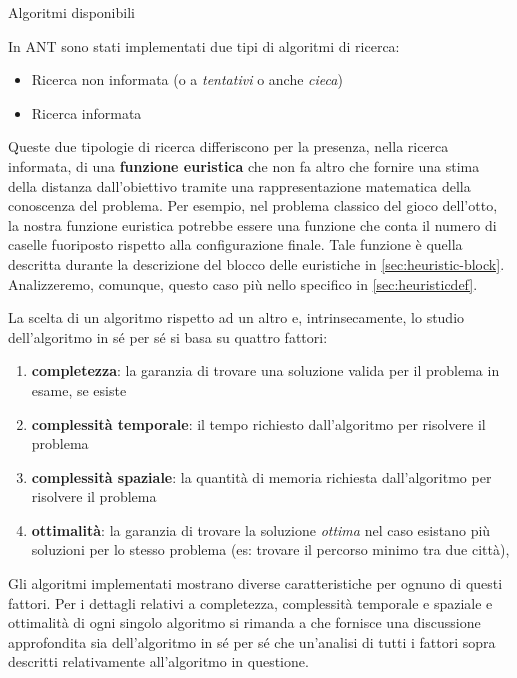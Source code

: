 \begin{chapter}{Algoritmi disponibili}
\label{sec:algoritmi}

In ANT sono stati implementati due tipi di algoritmi di ricerca:
\begin{itemize}
	\item Ricerca non informata (o a \textit{tentativi} o anche \textit{cieca})
	\item Ricerca informata
\end{itemize}

Queste due tipologie di ricerca differiscono per la presenza, nella ricerca
informata, di una \textbf{funzione euristica} che non fa altro che fornire una
stima della distanza dall'obiettivo tramite una rappresentazione matematica della
conoscenza del problema. Per esempio, nel problema classico del gioco dell'otto,
la nostra funzione euristica potrebbe essere una funzione che conta il numero di
caselle fuoriposto rispetto alla configurazione finale. Tale funzione \`e quella
descritta durante la descrizione del blocco delle euristiche in \ref{sec:heuristic-block}.
Analizzeremo, comunque, questo caso pi\`u nello specifico in \ref{sec:heuristicdef}.

La scelta di un algoritmo rispetto ad un altro e, intrinsecamente, lo studio
dell'algoritmo in s\'e per s\'e si basa su quattro fattori:

\begin{enumerate}
	\item \textbf{completezza}: la garanzia di trovare una soluzione valida per
        il problema in esame, se esiste
	\item \textbf{complessit\`a temporale}: il tempo richiesto dall'algoritmo per
        risolvere il problema
	\item \textbf{complessit\`a spaziale}: la quantit\`a di memoria richiesta
        dall'algoritmo per risolvere il problema
  \item \textbf{ottimalit\`a}: la garanzia di trovare la soluzione \textit{ottima}
        nel caso esistano pi\`u soluzioni per lo stesso problema (es: trovare il
        percorso minimo tra due citt\`a),
\end{enumerate}

Gli algoritmi implementati mostrano diverse caratteristiche per ognuno di questi
fattori. Per i dettagli relativi a completezza, complessit\`a temporale e spaziale
e ottimalit\`a di ogni singolo algoritmo si rimanda a \cite{norvig03} che fornisce
una discussione approfondita sia dell'algoritmo in s\'e per s\'e che un'analisi di
tutti i fattori sopra descritti relativamente all'algoritmo in questione.


\end{chapter}

